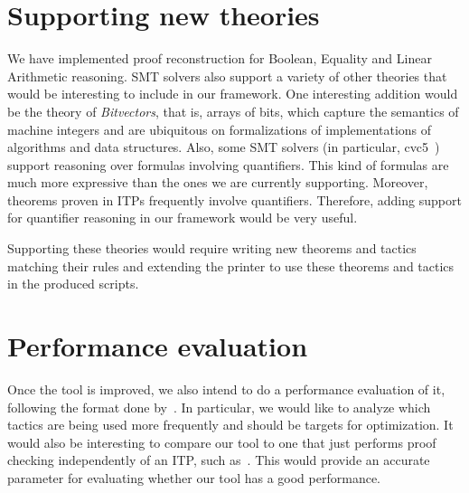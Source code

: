 \section{Supporting new theories}

We have implemented proof reconstruction for Boolean,
Equality and Linear Arithmetic reasoning. SMT solvers
also support a variety of other theories that would be interesting
to include in our framework. One interesting addition would be the theory of
\textit{Bitvectors}, that is, arrays of bits, which capture
the semantics of machine integers and are ubiquitous on formalizations
of implementations of algorithms and data structures. Also,
some SMT solvers (in particular, cvc5~\cite{quantElim}) support
reasoning over formulas involving quantifiers. This kind of
formulas are much more expressive than the ones we are currently
supporting. Moreover, theorems proven in ITPs frequently involve
quantifiers. Therefore, adding support for quantifier reasoning
in our framework would be very useful.

Supporting these theories would require writing new
theorems and tactics matching their rules and extending the
printer to use these theorems and tactics in the produced scripts.

\section{Performance evaluation}

Once the tool is improved, we also intend to do a performance evaluation of it,
following the format done by~\cite{carcara}. In particular, we would like to
analyze which tactics are being used more frequently and
should be targets for optimization. It would also be interesting
to compare our tool to one that just performs proof checking
independently of an ITP, such as~\cite{carcara}. This would provide
an accurate parameter for evaluating whether our tool has a good
performance.
